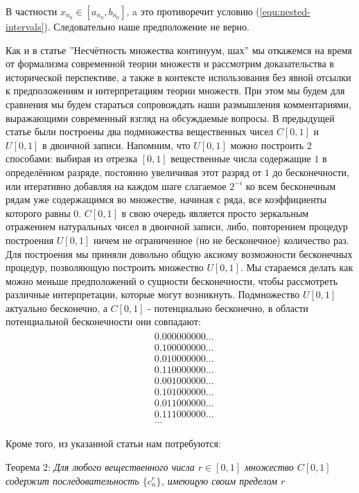 \documentclass[12pt]{article}
\begin{document}
В частности $x_{n_0} \in [a_{n_0}, b_{n_0}]$, a это противоречит условию (\ref{equ:nested-intervals}). Следовательно наше предположение не верно.

Как и в статье ''Несчётность множества континуум, шах'' мы откажемся на время от формализма современной теории множеств и рассмотрим доказательства в исторической перспективе, а также в контексте использования без явной отсылки к предположениям и интерпретациям теории множеств. При этом мы будем для сравнения мы будем стараться сопровождать наши размышления комментариями, выражающими современный взгляд на обсуждаемые вопросы. В предыдущей статье были построены два подмножества вещественных чисел $C[0, 1]$ и $U[0, 1]$ в двоичной записи. Напомним, что $U[0, 1]$ можно построить 2 способами: выбирая из отрезка $[0, 1]$ вещественные числа содержащие $1$ в определённом разряде, постоянно увеличивая этот разряд от $1$ до бесконечности, или итеративно добавляя на каждом шаге слагаемое $2^{-i}$ ко всем бесконечным рядам уже содержащимся во множестве, начиная с ряда, все коэффициенты которого равны $0$. $C[0, 1]$ в свою очередь является просто зеркальным отражением натуральных чисел в двоичной записи, либо, повторением процедур построения $U[0, 1]$ ничем не ограниченное (но не бесконечное) количество раз. Для построения мы приняли довольно общую аксиому возможности бесконечных процедур, позволяющую построить множество $U[0, 1]$. Мы стараемся делать как можно меньше предположений о сущности бесконечности, чтобы рассмотреть различные интерпретации, которые могут возникнуть. Подмножество $U[0, 1]$ актуально бесконечно, а $C[0, 1]$ - потенциально бесконечно, в области потенциальной бесконечности они совпадают:
\begin{align}
\begin{split}
&0.000000000\ldots\\
&0.100000000\ldots\\
&0.010000000\ldots\\
&0.110000000\ldots\\
&0.001000000\ldots\\
&0.101000000\ldots\\
&0.011000000\ldots\\
&0.111000000\ldots\\
&\ldots
\end{split}
\end{align}

Кроме того, из указанной статьи нам потребуются:

Теорема 2: {\sl Для любого вещественного числа $r \in [0, 1]$ множество $C[0, 1]$ содержит последовательность $\{c^r_n\}$, имеющую своим пределом $r$}
\end{document}
